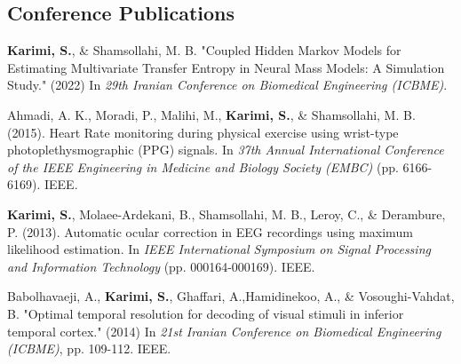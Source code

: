 \documentclass[
	10pt, %
]{FreemanCV}
\begin{document}
\begin{paracol}{2}

\section{Conference Publications}


\textbf{Karimi, S.}, \& Shamsollahi, M. B. "Coupled Hidden Markov Models for Estimating Multivariate Transfer Entropy in Neural Mass Models: A Simulation Study." (2022) In \textit{29th Iranian Conference on Biomedical Engineering (ICBME)}.
\medskip %

Ahmadi, A. K., Moradi, P., Malihi, M., \textbf{Karimi, S.}, \& Shamsollahi, M. B. (2015). Heart Rate monitoring during physical exercise using wrist-type photoplethysmographic (PPG) signals. In \textit{37th Annual International Conference of the IEEE Engineering in Medicine and Biology Society (EMBC)} (pp. 6166-6169). IEEE.
\medskip %


\textbf{Karimi, S.}, Molaee-Ardekani, B., Shamsollahi, M. B., Leroy, C., \& Derambure, P. (2013). Automatic ocular correction in EEG recordings using maximum likelihood estimation. In  \textit{IEEE International Symposium on Signal Processing and Information Technology} (pp. 000164-000169). IEEE.
\medskip %

Babolhavaeji, A., \textbf{Karimi, S.}, Ghaffari, A.,Hamidinekoo, A., \& Vosoughi-Vahdat, B. "Optimal temporal resolution for decoding of visual stimuli in inferior temporal cortex." (2014) In \textit{21st Iranian Conference on Biomedical Engineering (ICBME)}, pp. 109-112. IEEE.
\medskip %


\medskip %


\end{paracol} %

\end{document}
